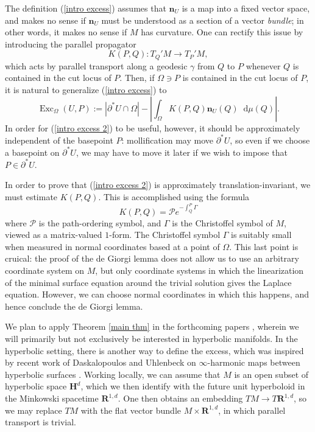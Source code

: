 \documentclass[reqno,11pt]{amsart}
\newcommand{\RR}{\mathbf{R}}
\newcommand{\Hyp}{\mathbf H}
\DeclareMathOperator{\Exc}{Exc}
\newcommand*\dif{\mathop{}\!\mathrm{d}}
\newcommand{\normal}{\mathbf n}
\theoremstyle{definition}
\numberwithin{equation}{section}
\begin{document}
The definition (\ref{intro excess}) assumes that $\normal_U$ is a map into a fixed vector space, and makes no sense if $\normal_U$ must be understood as a section of a vector \emph{bundle}; in other words, it makes no sense if $M$ has curvature.
One can rectify this issue by introducing the parallel propagator
$$K(P, Q): T_Q'M \to T_P'M,$$
which acts by parallel transport along a geodesic $\gamma$ from $Q$ to $P$ whenever $Q$ is contained in the cut locus of $P$.
Then, if $\Omega \ni P$ is contained in the cut locus of $P$, it is natural to generalize (\ref{intro excess}) to
\begin{equation}\label{intro excess 2}
\Exc_\Omega(U, P) := |\partial^* U \cap \Omega| - \left|\int_\Omega K(P, Q) \normal_U(Q) \dif \mu(Q)\right|.
\end{equation}
In order for (\ref{intro excess 2}) to be useful, however, it should be approximately independent of the basepoint $P$: mollification may move $\partial^* U$, so even if we choose a basepoint on $\partial^* U$, we may have to move it later if we wish to impose that $P \in \partial^* U$.

In order to prove that (\ref{intro excess 2}) is approximately translation-invariant, we must estimate $K(P, Q)$.
This is accomplished using the formula \cite[Chapter II, \S2]{baez1994gauge}
$$K(P, Q) = \mathcal Pe^{-\int_Q^P \Gamma}$$
where $\mathcal P$ is the path-ordering symbol, and $\Gamma$ is the Christoffel symbol of $M$, viewed as a matrix-valued $1$-form.
The Christoffel symbol $\Gamma$ is suitably small when measured in normal coordinates based at a point of $\Omega$.
This last point is cruical: the proof of the de Giorgi lemma does not allow us to use an arbitrary coordinate system on $M$, but only coordinate systems in which the linearization of the minimal surface equation around the trivial solution gives the Laplace equation.
However, we can choose normal coordinates in which this happens, and hence conclude the de Giorgi lemma.

We plan to apply Theorem \ref{main thm} in the forthcoming papers \cite{BackusCML, BackusInfinityMaxwell1}, wherein we will primarily but not exclusively be interested in hyperbolic manifolds.
In the hyperbolic setting, there is another way to define the excess, which was inspired by recent work of Daskalopoulos and Uhlenbeck on $\infty$-harmonic maps between hyperbolic surfaces \cite{daskalopoulosPrep1}.
Working locally, we can assume that $M$ is an open subset of hyperbolic space $\Hyp^d$, which we then identify with the future unit hyperboloid in the Minkowski spacetime $\RR^{1, d}$.
One then obtains an embedding $TM \to T\RR^{1, d}$, so we may replace $TM$ with the flat vector bundle $M \times \RR^{1, d}$, in which parallel transport is trivial.
\end{document}
